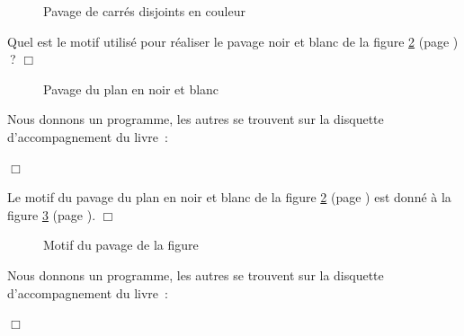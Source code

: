 \begin{figure}[htbp]
\vspace*{\textwidth}%
\vspace*{25mm}%
%
\vspace*{-\textwidth}%
\vspace*{-25mm}%
\caption{Pavage de carrés disjoints en couleur}\label{fig:pdcc}
\end{figure}
\begin{exercice}{Quel est le motif utilisé pour réaliser le pavage noir et blanc de la figure \ref{fig:pavhexond}
(page \pageref{fig:pavhexond})$\:$?
\noindent $\Box$}\end{exercice}
\begin{figure}[htbp]
 \caption{Pavage du plan en noir et blanc}\label{fig:pavhexond}
\end{figure}
\begin{corrige}{
Nous donnons un programme, les autres se trouvent sur la disquette  d'accompagnement du livre~:

\noindent $\Box$}\end{corrige}
\begin{corrige}{
Le motif du pavage du plan en noir et blanc de la figure \ref{fig:pavhexond}
(page \pageref{fig:pavhexond}) est donné à la figure \ref{fig:motpavhexond}
(page \pageref{fig:motpavhexond}).
\noindent $\Box$}\end{corrige}
\begin{figure}[htbp]
 \caption{Motif du pavage de la figure \protect{\ref{fig:pavhexond}}}\label{fig:motpavhexond}
\end{figure}
\newpage
\begin{corrige}{
Nous donnons un programme, les autres se trouvent sur la disquette  d'accompagnement du livre~:

\noindent $\Box$}\end{corrige}

\vfill


